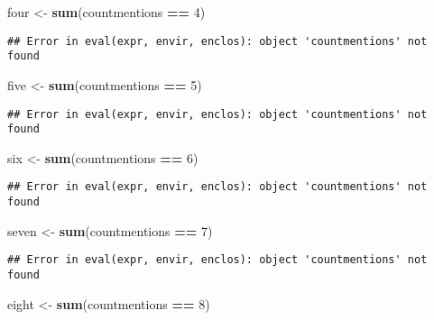 \documentclass[]{article}
\newenvironment{Shaded}{\begin{snugshade}}{\end{snugshade}}
\newcommand{\KeywordTok}[1]{\textcolor[rgb]{0.13,0.29,0.53}{\textbf{#1}}}
\newcommand{\DecValTok}[1]{\textcolor[rgb]{0.00,0.00,0.81}{#1}}
\newcommand{\StringTok}[1]{\textcolor[rgb]{0.31,0.60,0.02}{#1}}
\newcommand{\OperatorTok}[1]{\textcolor[rgb]{0.81,0.36,0.00}{\textbf{#1}}}
\newcommand{\NormalTok}[1]{#1}
\begin{document}
\begin{Shaded}
\begin{Highlighting}[]
\NormalTok{four <-}\StringTok{ }\KeywordTok{sum}\NormalTok{(countmentions }\OperatorTok{==}\StringTok{ }\DecValTok{4}\NormalTok{)}
\end{Highlighting}
\end{Shaded}

\begin{verbatim}
## Error in eval(expr, envir, enclos): object 'countmentions' not found
\end{verbatim}

\begin{Shaded}
\begin{Highlighting}[]
\NormalTok{five <-}\StringTok{ }\KeywordTok{sum}\NormalTok{(countmentions }\OperatorTok{==}\StringTok{ }\DecValTok{5}\NormalTok{)}
\end{Highlighting}
\end{Shaded}

\begin{verbatim}
## Error in eval(expr, envir, enclos): object 'countmentions' not found
\end{verbatim}

\begin{Shaded}
\begin{Highlighting}[]
\NormalTok{six <-}\StringTok{ }\KeywordTok{sum}\NormalTok{(countmentions }\OperatorTok{==}\StringTok{ }\DecValTok{6}\NormalTok{)}
\end{Highlighting}
\end{Shaded}

\begin{verbatim}
## Error in eval(expr, envir, enclos): object 'countmentions' not found
\end{verbatim}

\begin{Shaded}
\begin{Highlighting}[]
\NormalTok{seven <-}\StringTok{ }\KeywordTok{sum}\NormalTok{(countmentions }\OperatorTok{==}\StringTok{ }\DecValTok{7}\NormalTok{)}
\end{Highlighting}
\end{Shaded}

\begin{verbatim}
## Error in eval(expr, envir, enclos): object 'countmentions' not found
\end{verbatim}

\begin{Shaded}
\begin{Highlighting}[]
\NormalTok{eight <-}\StringTok{ }\KeywordTok{sum}\NormalTok{(countmentions }\OperatorTok{==}\StringTok{ }\DecValTok{8}\NormalTok{)}
\end{Highlighting}
\end{Shaded}
\end{document}
